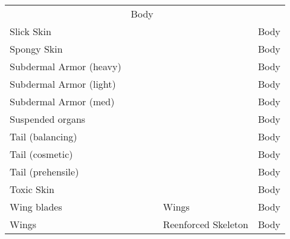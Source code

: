 \documentclass[twoside]{book}
\begin{document}
\begin{longtable}{p{1.25in}p{2em}ll}
  &
   Body 
  \tabularnewline
      
  \raggedright
           Slick Skin 
  &
  
  &
  
  &
   Body 
  \tabularnewline
      
  \raggedright
           Spongy Skin 
  &
  
  &
  
  &
   Body 
  \tabularnewline
      
  \raggedright
           Subdermal Armor (heavy)
           
  &
  
  &
  
  &
   Body 
  \tabularnewline
      
  \raggedright
           Subdermal Armor (light)
           
  &
  
  &
  
  &
   Body 
  \tabularnewline
      
  \raggedright
           Subdermal Armor (med) 
  &
  
  &
  
  &
   Body 
  \tabularnewline
      
  \raggedright
           Suspended organs 
  &
  
  &
  
  &
   Body 
  \tabularnewline
      
  \raggedright
           Tail (balancing) 
  &
  
  &
  
  &
   Body 
  \tabularnewline
      
  \raggedright
           Tail (cosmetic) 
  &
  
  &
  
  &
   Body 
  \tabularnewline
      
  \raggedright
           Tail (prehensile) 
  &
  
  &
  
  &
   Body 
  \tabularnewline
      
  \raggedright
           Toxic Skin 
  &
  
  &
  
  &
   Body 
  \tabularnewline
      
  \raggedright
           Wing blades 
  &
  
  &
   Wings 
  &
   Body 
  \tabularnewline
      
  \raggedright
           Wings 
  &
  
  &
   Reenforced Skeleton
           
  &
   Body 
  \tabularnewline
      
\end{longtable}
    
\end{document}
